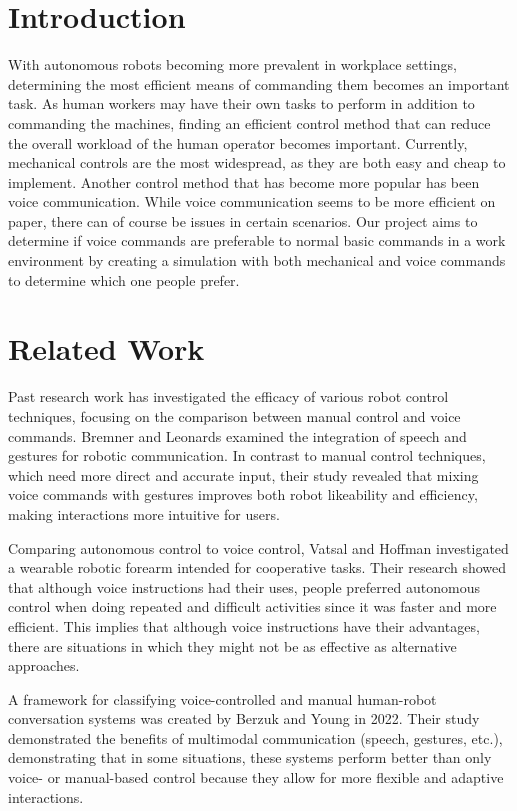 \documentclass[conference]{IEEEtran}
\begin{document}
\section{Introduction}
With autonomous robots becoming more prevalent in workplace settings, determining the most efficient means of commanding them becomes an important task. As human workers may have their own tasks to perform in addition to commanding the machines, finding an efficient control method that can reduce the overall workload of the human operator becomes important. Currently, mechanical controls are the most widespread, as they are both easy and cheap to implement. Another control method that has become more popular has been voice communication. While voice communication seems to be more efficient on paper, there can of course be issues in certain scenarios. Our project aims to determine if voice commands are preferable to normal basic commands in a work environment by creating a simulation with both mechanical and voice commands to determine which one people prefer.  

\section{Related Work}
Past research work has investigated the efficacy of various robot control techniques, focusing on the comparison between manual control and voice commands. Bremner and Leonards \cite{7139460}\cite{10.3389/fpsyg.2016.00183} examined the integration of speech and gestures for robotic communication. In contrast to manual control techniques, which need more direct and accurate input, their study revealed that mixing voice commands with gestures improves both robot likeability and efficiency, making interactions more intuitive for users. 

Comparing autonomous control to voice control, Vatsal and Hoffman \cite{8461212} investigated a wearable robotic forearm intended for cooperative tasks. Their research showed that although voice instructions had their uses, people preferred autonomous control when doing repeated and difficult activities since it was faster and more efficient. This implies that although voice instructions have their advantages, there are situations in which they might not be as effective as alternative approaches. 

A framework for classifying voice-controlled and manual human-robot conversation systems was created by Berzuk and Young in 2022\cite{9889423}. Their study demonstrated the benefits of multimodal communication (speech, gestures, etc.), demonstrating that in some situations, these systems perform better than only voice- or manual-based control because they allow for more flexible and adaptive interactions. 
\end{document}

